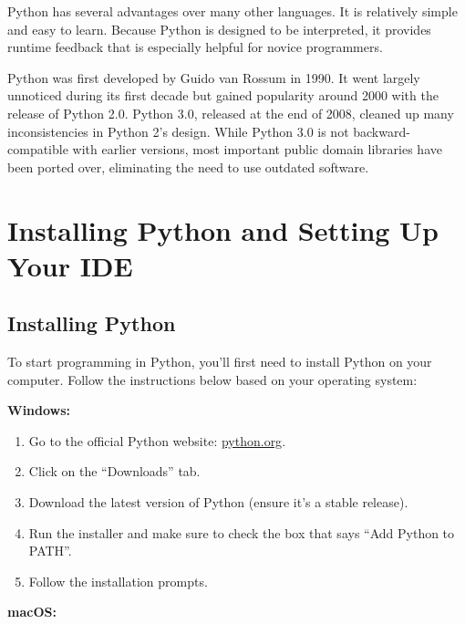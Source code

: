 \documentclass[
  letterpaper,
  DIV=11,
  numbers=noendperiod]{scrreprt}
\providecommand{\tightlist}{%
  \setlength{\itemsep}{0pt}\setlength{\parskip}{0pt}}\usepackage{longtable,booktabs,array}
\begin{document}
Python has several advantages over many other languages. It is
relatively simple and easy to learn. Because Python is designed to be
interpreted, it provides runtime feedback that is especially helpful for
novice programmers.

Python was first developed by Guido van Rossum in 1990. It went largely
unnoticed during its first decade but gained popularity around 2000 with
the release of Python 2.0. Python 3.0, released at the end of 2008,
cleaned up many inconsistencies in Python 2's design. While Python 3.0
is not backward-compatible with earlier versions, most important public
domain libraries have been ported over, eliminating the need to use
outdated software.


\hypertarget{installing-python-and-setting-up-your-ide}{%
\chapter{Installing Python and Setting Up Your
IDE}\label{installing-python-and-setting-up-your-ide}}

\hypertarget{installing-python}{%
\section{Installing Python}\label{installing-python}}

To start programming in Python, you'll first need to install Python on
your computer. Follow the instructions below based on your operating
system:

\textbf{Windows:}

\begin{enumerate}
\def\labelenumi{\arabic{enumi}.}
\tightlist
\item
  Go to the official Python website:
  \href{https://www.python.org/}{python.org}.
\item
  Click on the ``Downloads'' tab.
\item
  Download the latest version of Python (ensure it's a stable release).
\item
  Run the installer and make sure to check the box that says ``Add
  Python to PATH''.
\item
  Follow the installation prompts.
\end{enumerate}

\textbf{macOS:}
\end{document}
